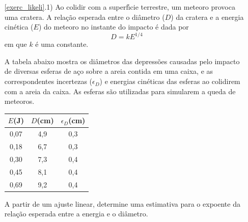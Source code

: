 \begin{itemize}

\item[\ref{exerc_likeli}.1)]
Ao colidir com a superf\'{\i}cie terrestre, um meteoro provoca uma cratera. A rela\c{c}\~{a}o esperada entre o di\^{a}metro ($D$) da cratera e a energia cin\'{e}tica ($E$) do meteoro no instante do impacto \'{e} dada por
$$ D = k E^{1/4} $$
em que $k$ \'{e} uma constante.

A tabela abaixo mostra os di\^{a}metros das depress\~{o}es causadas pelo impacto de diversas esferas de a\c{c}o sobre a areia contida em uma caixa, e as correspondentes  incertezas ($\epsilon_D$) e energias cin\'{e}ticas das esferas ao colidirem com a areia da caixa. As esferas s\~{a}o utilizadas para simularem a queda de meteoros.

\renewcommand{\arraystretch}{1.14}


\hspace{0.3cm}
\begin{center}
{\small
\begin{tabular}{c|c|c}
        $E$(J)  &  $D$(cm)  &  $\epsilon_D$(cm) \\ \hline
     0,07 &   4,9 &  0,3  \\
     0,18 &   6,7 &  0,3  \\
     0,30 &    7,3 &   0,4  \\
     0,45  &   8,1  &  0,4   \\
     0,69 &    9,2 &   0,4  \\
  \hline
      \end{tabular}
}
\end{center}
\renewcommand{\arraystretch}{1}



\vspace{0.5cm}
A partir de um ajuste linear, determine uma estimativa para o expoente da rela\c{c}\~{a}o esperada entre a energia e o di\^{a}metro.

%
%


\end{itemize}

